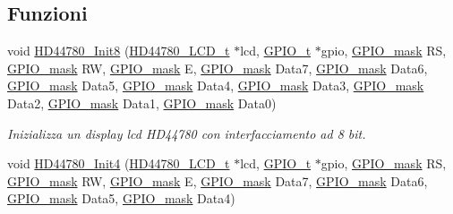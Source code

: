 \subsection*{Funzioni}
\begin{DoxyCompactItemize}
\item 
void \hyperlink{group___l_c_d_ga2df14171c71a8afda59e3ae1733c5469}{H\+D44780\+\_\+\+Init8} (\hyperlink{struct_h_d44780___l_c_d__t}{H\+D44780\+\_\+\+L\+C\+D\+\_\+t} $\ast$lcd, \hyperlink{struct_g_p_i_o__t}{G\+P\+I\+O\+\_\+t} $\ast$gpio, \hyperlink{group___g_p_i_o_ga6d5aef8a8a54ee2f602d47252ff66595}{G\+P\+I\+O\+\_\+mask} R\+S, \hyperlink{group___g_p_i_o_ga6d5aef8a8a54ee2f602d47252ff66595}{G\+P\+I\+O\+\_\+mask} R\+W, \hyperlink{group___g_p_i_o_ga6d5aef8a8a54ee2f602d47252ff66595}{G\+P\+I\+O\+\_\+mask} E, \hyperlink{group___g_p_i_o_ga6d5aef8a8a54ee2f602d47252ff66595}{G\+P\+I\+O\+\_\+mask} Data7, \hyperlink{group___g_p_i_o_ga6d5aef8a8a54ee2f602d47252ff66595}{G\+P\+I\+O\+\_\+mask} Data6, \hyperlink{group___g_p_i_o_ga6d5aef8a8a54ee2f602d47252ff66595}{G\+P\+I\+O\+\_\+mask} Data5, \hyperlink{group___g_p_i_o_ga6d5aef8a8a54ee2f602d47252ff66595}{G\+P\+I\+O\+\_\+mask} Data4, \hyperlink{group___g_p_i_o_ga6d5aef8a8a54ee2f602d47252ff66595}{G\+P\+I\+O\+\_\+mask} Data3, \hyperlink{group___g_p_i_o_ga6d5aef8a8a54ee2f602d47252ff66595}{G\+P\+I\+O\+\_\+mask} Data2, \hyperlink{group___g_p_i_o_ga6d5aef8a8a54ee2f602d47252ff66595}{G\+P\+I\+O\+\_\+mask} Data1, \hyperlink{group___g_p_i_o_ga6d5aef8a8a54ee2f602d47252ff66595}{G\+P\+I\+O\+\_\+mask} Data0)
\begin{DoxyCompactList}\small\item\em Inizializza un display lcd H\+D44780 con interfacciamento ad 8 bit. \end{DoxyCompactList}\item 
void \hyperlink{group___l_c_d_gad8f777df204bc630b77924e0a96e5673}{H\+D44780\+\_\+\+Init4} (\hyperlink{struct_h_d44780___l_c_d__t}{H\+D44780\+\_\+\+L\+C\+D\+\_\+t} $\ast$lcd, \hyperlink{struct_g_p_i_o__t}{G\+P\+I\+O\+\_\+t} $\ast$gpio, \hyperlink{group___g_p_i_o_ga6d5aef8a8a54ee2f602d47252ff66595}{G\+P\+I\+O\+\_\+mask} R\+S, \hyperlink{group___g_p_i_o_ga6d5aef8a8a54ee2f602d47252ff66595}{G\+P\+I\+O\+\_\+mask} R\+W, \hyperlink{group___g_p_i_o_ga6d5aef8a8a54ee2f602d47252ff66595}{G\+P\+I\+O\+\_\+mask} E, \hyperlink{group___g_p_i_o_ga6d5aef8a8a54ee2f602d47252ff66595}{G\+P\+I\+O\+\_\+mask} Data7, \hyperlink{group___g_p_i_o_ga6d5aef8a8a54ee2f602d47252ff66595}{G\+P\+I\+O\+\_\+mask} Data6, \hyperlink{group___g_p_i_o_ga6d5aef8a8a54ee2f602d47252ff66595}{G\+P\+I\+O\+\_\+mask} Data5, \hyperlink{group___g_p_i_o_ga6d5aef8a8a54ee2f602d47252ff66595}{G\+P\+I\+O\+\_\+mask} Data4)

\end{DoxyCompactItemize}
